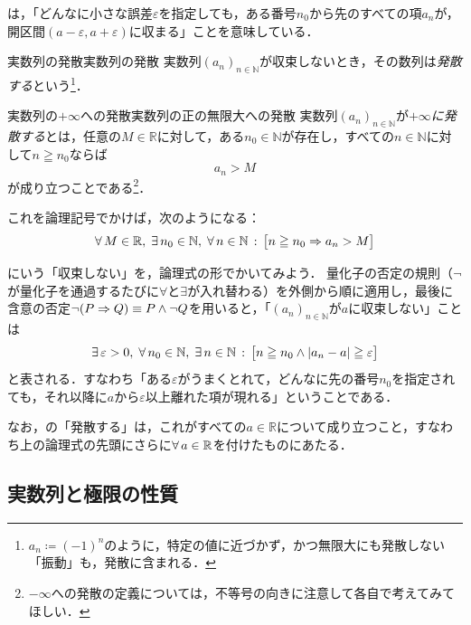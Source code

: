 は，「どんなに小さな誤差$\varepsilon$を指定しても，ある番号$n_0$から先のすべての項$a_n$が，開区間$(a-\varepsilon, a+\varepsilon)$に収まる」ことを意味している．

\begin{definition}{実数列の発散}{実数列の発散}
  実数列$(a_n)_{n \in \mathbb{N}}$が収束しないとき，その数列は\emph{発散する}という\footnote{$a_n \coloneqq (-1)^n$のように，特定の値に近づかず，かつ無限大にも発散しない「振動」も，発散に含まれる．}．
\end{definition}

\begin{definition}{実数列の$+\infty$への発散}{実数列の正の無限大への発散}
  実数列$(a_n)_{n \in \mathbb{N}}$が\emph{$+\infty$に発散する}とは，任意の$M \in \mathbb{R}$に対して，ある$n_0 \in \mathbb{N}$が存在し，すべての$n \in \mathbb{N}$に対して$n \geqq n_0$ならば
  \[
    a_n > M
  \]
  が成り立つことである\footnote{$-\infty$への発散の定義については，不等号の向きに注意して各自で考えてみてほしい．}．

  これを論理記号でかけば，次のようになる：
  \[
    \lall{M \in \mathbb{R}} \lsep \lex{n_0 \in \mathbb{N}} \lsep \lall{n \in \mathbb{N}} \lst
    \bigl[ n \geqq n_0 \limp a_n > M \bigr]
  \]
\end{definition}

\begin{remark}
  にいう「収束しない」を，論理式の形でかいてみよう．
  量化子の否定の規則（$\lnot$が量化子を通過するたびに$\forall$と$\exists$が入れ替わる）を外側から順に適用し，最後に含意の否定$\lnot ( P \limp Q ) \equiv P \land \lnot Q$を用いると，「$(a_n)_{n \in \mathbb{N}}$が$a$に収束しない」ことは
  \[
    \lex{\varepsilon > 0} \lsep \lall{n_0 \in \mathbb{N}} \lsep \lex{n \in \mathbb{N}} \lst
    \bigl[ n \geqq n_0 \land \abs*{a_n - a} \geqq \varepsilon \bigr]
  \]
  と表される．すなわち「ある$\varepsilon$がうまくとれて，どんなに先の番号$n_0$を指定されても，それ以降に$a$から$\varepsilon$以上離れた項が現れる」ということである．

  なお，の「発散する」は，これがすべての$a \in \mathbb{R}$について成り立つこと，すなわち上の論理式の先頭にさらに$\lall{a \in \mathbb{R}}$を付けたものにあたる．
\end{remark}

\subsection{実数列と極限の性質}

